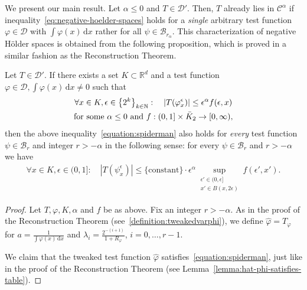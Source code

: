 We present our main result. Let \( \alpha \leq 0 \) and \( T \in \mathcal{D}' \). Then, \( T \) already lies in \( \mathcal{C}^\alpha \) if inequality~\eqref{eq:negative-hoelder-spaces} holds for a \emph{single} arbitrary test function \( \varphi \in \mathcal{D} \) with \( \int \varphi(x) \, \mathrm{d}x \) rather for all \( \psi \in \mathcal{B}_{r_\alpha} \). This characterization of negative Hölder spaces is obtained from the following proposition, which is proved in a similar fashion as the Reconstruction Theorem.

\begin{proposition}\label{proposition:spiderman}
  Let \( T \in \mathcal{D}' \). If there exists a set \( K \subset \mathbb{R}^d \) and a test function \( \varphi \in \mathcal{D}, \int \varphi(x) \, \mathrm{d}x \neq 0 \) such that 
  \begin{gather}\label{equation:spiderman}
    \forall x \in K, \epsilon \in \left\{ 2^{k} \right\}_{k \in \mathbb{N}}: \quad |T(\varphi^\epsilon_x)| \leq \epsilon^\alpha f(\epsilon, x) \\
    \text{for some \( \alpha \leq 0 \) and \( f: (0,1] \times \bar{K}_{2} \to [0, \infty) \)}, \nonumber
  \end{gather}
  then the above inequality~\eqref{equation:spiderman} also holds for \emph{every} test function \( \psi \in \mathcal{B}_r \) and integer \( r > -\alpha \) in the following sense: for every \( \psi \in \mathcal{B}_r \) and \(r > -\alpha\) we have
  \begin{align*}
    \forall x \in K, \epsilon \in (0,1]: \quad |T(\psi^\epsilon_x)| \leq \{ \mathrm{constant} \} \cdot \epsilon^\alpha \sup_{\substack{\epsilon' \in (0, \epsilon]\\x' \in B(x, 2\epsilon)}} f(\epsilon', x').
  \end{align*}
\end{proposition}

\begin{proof}
  Let \( T, \varphi, K, \alpha \) and \( f \) be as above. Fix an integer \( r > -\alpha \). As in the proof of the Reconstruction Theorem (see~\eqref{definition:tweakedvarphi}), we define \( \hat \varphi = T_\varphi \) for \(a = \frac{1}{\int \varphi(x) \, \mathrm{d}x}\) and \(\lambda_i = \frac{2^{-(i+1)}}{1+R_\varphi}\), \(i = 0,\ldots,r-1\). 
  
  We claim that the tweaked test function \( \hat \varphi \) satisfies~\eqref{equation:spiderman}, just like in the proof of the Reconstruction Theorem (see Lemma~\ref{lemma:hat-phi-satisfies-table}).
\end{proof}

